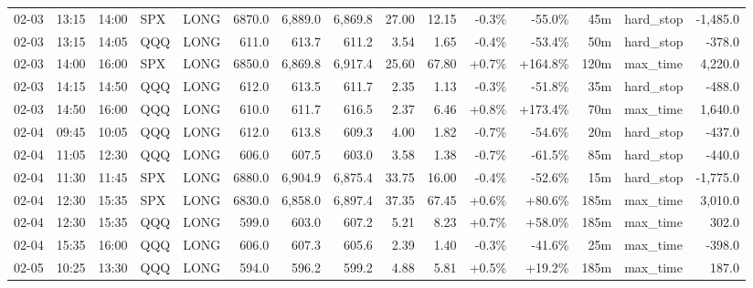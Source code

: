 \documentclass[11pt,a4paper,twoside]{article}
\begin{document}
\begin{landscape}
\begin{center}
\begin{longtable}{>{\color{txtmain}}l l l l l r r r r r r r r >{\color{txtmain}}l r}
02-03 & 13:15 & 14:00 & SPX & LONG & 6870.0 & 6,889.0 & 6,869.8 & 27.00 & 12.15 & \textcolor{lossred}{-0.3\%} & \textcolor{lossred}{-55.0\%} & 45m & hard\_stop & \textcolor{lossred}{-1,485.0} \\
02-03 & 13:15 & 14:05 & QQQ & LONG & 611.0 & 613.7 & 611.2 & 3.54 & 1.65 & \textcolor{lossred}{-0.4\%} & \textcolor{lossred}{-53.4\%} & 50m & hard\_stop & \textcolor{lossred}{-378.0} \\
02-03 & 14:00 & 16:00 & SPX & LONG & 6850.0 & 6,869.8 & 6,917.4 & 25.60 & 67.80 & \textcolor{wingreen}{+0.7\%} & \textcolor{wingreen}{+164.8\%} & 120m & max\_time & \textcolor{wingreen}{4,220.0} \\
02-03 & 14:15 & 14:50 & QQQ & LONG & 612.0 & 613.5 & 611.7 & 2.35 & 1.13 & \textcolor{lossred}{-0.3\%} & \textcolor{lossred}{-51.8\%} & 35m & hard\_stop & \textcolor{lossred}{-488.0} \\
02-03 & 14:50 & 16:00 & QQQ & LONG & 610.0 & 611.7 & 616.5 & 2.37 & 6.46 & \textcolor{wingreen}{+0.8\%} & \textcolor{wingreen}{+173.4\%} & 70m & max\_time & \textcolor{wingreen}{1,640.0} \\
02-04 & 09:45 & 10:05 & QQQ & LONG & 612.0 & 613.8 & 609.3 & 4.00 & 1.82 & \textcolor{lossred}{-0.7\%} & \textcolor{lossred}{-54.6\%} & 20m & hard\_stop & \textcolor{lossred}{-437.0} \\
02-04 & 11:05 & 12:30 & QQQ & LONG & 606.0 & 607.5 & 603.0 & 3.58 & 1.38 & \textcolor{lossred}{-0.7\%} & \textcolor{lossred}{-61.5\%} & 85m & hard\_stop & \textcolor{lossred}{-440.0} \\
02-04 & 11:30 & 11:45 & SPX & LONG & 6880.0 & 6,904.9 & 6,875.4 & 33.75 & 16.00 & \textcolor{lossred}{-0.4\%} & \textcolor{lossred}{-52.6\%} & 15m & hard\_stop & \textcolor{lossred}{-1,775.0} \\
02-04 & 12:30 & 15:35 & SPX & LONG & 6830.0 & 6,858.0 & 6,897.4 & 37.35 & 67.45 & \textcolor{wingreen}{+0.6\%} & \textcolor{wingreen}{+80.6\%} & 185m & max\_time & \textcolor{wingreen}{3,010.0} \\
02-04 & 12:30 & 15:35 & QQQ & LONG & 599.0 & 603.0 & 607.2 & 5.21 & 8.23 & \textcolor{wingreen}{+0.7\%} & \textcolor{wingreen}{+58.0\%} & 185m & max\_time & \textcolor{wingreen}{302.0} \\
02-04 & 15:35 & 16:00 & QQQ & LONG & 606.0 & 607.3 & 605.6 & 2.39 & 1.40 & \textcolor{lossred}{-0.3\%} & \textcolor{lossred}{-41.6\%} & 25m & max\_time & \textcolor{lossred}{-398.0} \\
02-05 & 10:25 & 13:30 & QQQ & LONG & 594.0 & 596.2 & 599.2 & 4.88 & 5.81 & \textcolor{wingreen}{+0.5\%} & \textcolor{wingreen}{+19.2\%} & 185m & max\_time & \textcolor{wingreen}{187.0} \\

\end{longtable}
\end{center}
\end{landscape}
\end{document}

